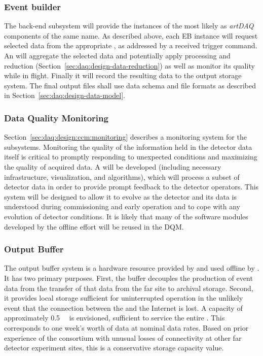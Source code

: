 \subsubsection{Event builder}
\label{sec:daq:design-event-builder}

The  back-end subsystem will provide the instances of the 
most likely as \textit{artDAQ}~\cite{artdaq} components of the same name.
As described above, each EB instance will request selected data from the
appropriate , as addressed by a received trigger command. 
An  will aggregate the selected data and potentially apply processing
and reduction (Section~\ref{sec:daq:design-data-reduction}) as well as monitor
its quality while in flight.
Finally it will record the resulting data to the output storage system.
The final output files shall use data schema and file formats as described in
Section~\ref{sec:daq:design-data-model}.


\subsubsection{Data Quality Monitoring}
\label{sec:daq:design-data-quality}

Section~\ref{sec:daq:design:ccm:monitoring} describes a monitoring system for
the  subsystems. 
Monitoring the quality of the information held in the detector data itself is
critical to promptly responding to unexpected conditions and maximizing the
quality of acquired data. 
A   will be developed (including necessary
infrastructure, visualization, and algorithms), which will process a subset of
detector data in order to provide prompt feedback to the detector operators. 
This system will be designed to allow it to evolve as the detector and its data
is understood during commissioning and early operation and to cope with any
evolution of detector conditions.
It is likely that many of the software modules developed by the offline effort
will be reused in the DQM.

\subsubsection{Output Buffer}

The output buffer system is a hardware resource provided by  and used
offline by . 
It has two primary purposes. 
First, the buffer decouples the production of event data from the transfer of
that data from the far site to archival storage.
Second, it provides local storage sufficient for uninterrupted 
operation in the unlikely event that the connection between the  and
the Internet is lost. 
A capacity of approximately \SI{0.5}{\peta\byte} is envisioned, sufficient to
service the entire .
This corresponds to one week's worth of data at nominal data rates.
Based on prior experience of the consortium with unusual losses of connectivity
at other far detector experiment sites, this is a conservative storage capacity
value.

